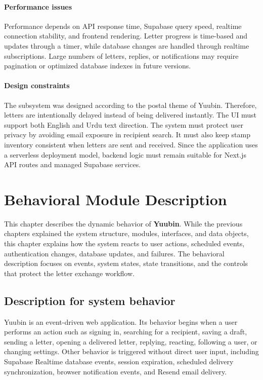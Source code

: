 ﻿\documentclass[12pt,a4paper]{report}
\begin{document}
\subsubsection{Performance issues}

Performance depends on API response time, Supabase query speed, realtime connection stability, and frontend rendering. Letter progress is time-based and updates through a timer, while database changes are handled through realtime subscriptions. Large numbers of letters, replies, or notifications may require pagination or optimized database indexes in future versions.

\subsubsection{Design constraints}

The subsystem was designed according to the postal theme of Yuubin. Therefore, letters are intentionally delayed instead of being delivered instantly. The UI must support both English and Urdu text direction. The system must protect user privacy by avoiding email exposure in recipient search. It must also keep stamp inventory consistent when letters are sent and received. Since the application uses a serverless deployment model, backend logic must remain suitable for Next.js API routes and managed Supabase services.

\clearpage

\chapter{Behavioral Module Description}

This chapter describes the dynamic behavior of \textbf{Yuubin}. While the previous chapters explained the system structure, modules, interfaces, and data objects, this chapter explains how the system reacts to user actions, scheduled events, authentication changes, database updates, and failures. The behavioral description focuses on events, system states, state transitions, and the controls that protect the letter exchange workflow.

\section{Description for system behavior}

Yuubin is an event-driven web application. Its behavior begins when a user performs an action such as signing in, searching for a recipient, saving a draft, sending a letter, opening a delivered letter, replying, reacting, following a user, or changing settings. Other behavior is triggered without direct user input, including Supabase Realtime database events, session expiration, scheduled delivery synchronization, browser notification events, and Resend email delivery.
\end{document}

